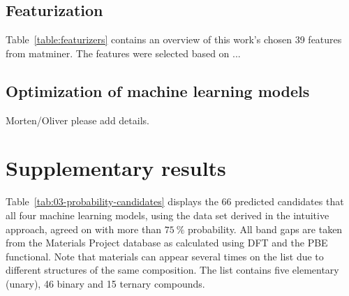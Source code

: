 \documentclass[superscriptaddress,unsortedaddress,
 amsmath,amssymb,
 aps,
]{revtex4-2}
\begin{document}
\subsection*{Featurization}
Table~\ref{table:featurizers} contains an overview of this work's chosen 39 features from matminer. The features were selected based on ... 



\subsection*{Optimization of machine learning models}
Morten/Oliver please add details. 

\section*{Supplementary results}
Table~\ref{tab:03-probability-candidates}  displays the 66 predicted candidates that all four machine learning models, using the data set derived in the intuitive approach, agreed on with more than $75 \ \%$ probability.  All band gaps are taken from the Materials Project database as calculated using DFT and the PBE functional. Note that materials can appear several times  on  the  list due  to  different  structures of the same composition. The  list  contains five elementary (unary), 46  binary and  15 ternary compounds. 




\end{document}

